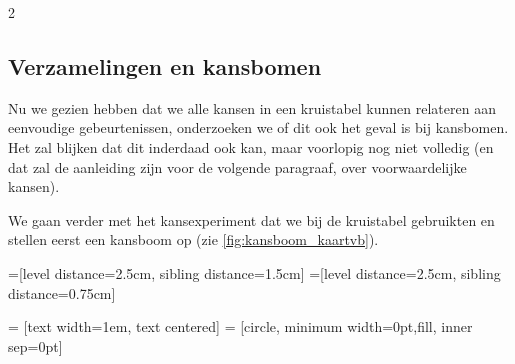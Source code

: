 \begin{multicols}{2}
\subsection*{Verzamelingen en kansbomen}
Nu we gezien hebben dat we alle kansen in een kruistabel kunnen relateren aan eenvoudige gebeurtenissen, onderzoeken we of dit ook het geval is bij kansbomen. Het zal blijken dat dit inderdaad ook kan, maar voorlopig nog niet volledig (en dat zal de aanleiding zijn voor de volgende paragraaf, over voorwaardelijke kansen).

We gaan verder met het kansexperiment dat we bij de kruistabel gebruikten en stellen eerst een kansboom op (zie \autoref{fig:kansboom_kaartvb}).


=[level distance=2.5cm, sibling distance=1.5cm]
=[level distance=2.5cm, sibling distance=0.75cm]

 = [text width=1em, text centered]
 = [circle, minimum width=0pt,fill, inner sep=0pt]


\end{multicols}
